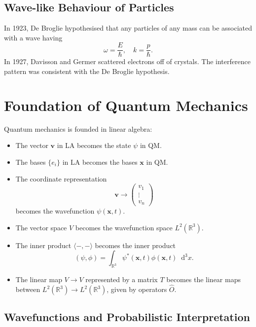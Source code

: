\documentclass[12pt]{article}
\newcommand{\Diff}[1]{\mathop{}\!\mathrm{d}^{#1}}
\theoremstyle{definition}
\theoremstyle{remark}
\begin{document}
\subsection{Wave-like Behaviour of Particles}%
\label{sub:wave_like_behaviour_of_particles}

In 1923, De Broglie hypothesised that any particles of any mass can be associated with a wave having
\[
\omega = \frac{E}{\hbar}, \quad k = \frac{p}{\hbar}
.\]
In 1927, Davisson and Germer scattered electrons off of crystals. The interference pattern was consistent with the De Broglie hypothesis.

\newpage

\section{Foundation of Quantum Mechanics}%
\label{sec:foundation_of_quantum_mechanics}

Quantum mechanics is founded in linear algebra:

\begin{itemize}
	\item The vector $\mathbf{v}$ in LA becomes the state $\psi$ in QM.
	\item The bases $\{e_i\}$ in LA becomes the bases $\mathbf{x}$ in QM.
	\item The coordinate representation
		\[
		\mathbf{v} \to
		\begin{pmatrix}
			v_1 \\
			\vdots \\
			v_n
		\end{pmatrix}
		\]
		becomes the wavefunction $\psi(\mathbf{x}, t)$.
	\item The vector space $V$ becomes the wavefunction space $L^2(\mathbb{R}^3)$.
	\item The inner product $\langle -, - \rangle$ becomes the inner product
		\[
			(\psi, \phi) = \int_{\mathbb{R}^3} \psi^{\ast}(\mathbf{x}, t) \phi(\mathbf{x}, t)\Diff3 x
		.\]
	\item The linear map $V \to V$ represented by a matrix $T$ becomes the linear maps between $L^2(\mathbb{R}^3) \to L^2(\mathbb{R}^3)$, given by operators $\hat O$.
\end{itemize}

\subsection{Wavefunctions and Probabilistic Interpretation}%
\label{sub:wavefunctions_and_probabilistic_interpretation}
\end{document}
